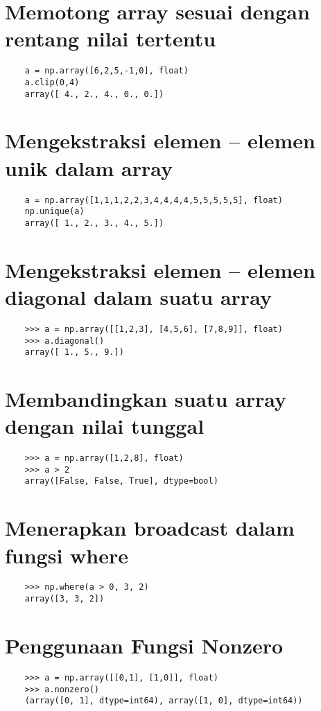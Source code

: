 \documentclass[12pt]{article} %
\begin{document}
\section {Memotong array sesuai dengan rentang nilai tertentu}
\begin{lstlisting}
	a = np.array([6,2,5,-1,0], float)
	a.clip(0,4)
	array([ 4., 2., 4., 0., 0.])
\end{lstlisting}

\section {Mengekstraksi elemen – elemen unik dalam array}
\begin{lstlisting}
	a = np.array([1,1,1,2,2,3,4,4,4,4,5,5,5,5,5], float)
	np.unique(a)
	array([ 1., 2., 3., 4., 5.])
\end{lstlisting}

\section {Mengekstraksi elemen – elemen diagonal dalam suatu array}
\begin{lstlisting}
	>>> a = np.array([[1,2,3], [4,5,6], [7,8,9]], float)
	>>> a.diagonal()
	array([ 1., 5., 9.])
\end{lstlisting}

\section {Membandingkan suatu array dengan nilai tunggal}
\begin{lstlisting}
	>>> a = np.array([1,2,8], float)
	>>> a > 2
	array([False, False, True], dtype=bool)
\end{lstlisting}

\section { Menerapkan broadcast dalam fungsi where}
\begin{lstlisting}
	>>> np.where(a > 0, 3, 2)
	array([3, 3, 2])
\end{lstlisting}

\section { Penggunaan Fungsi Nonzero}
\begin{lstlisting}
	>>> a = np.array([[0,1], [1,0]], float)
	>>> a.nonzero()
	(array([0, 1], dtype=int64), array([1, 0], dtype=int64))
\end{lstlisting}
\end{document}
